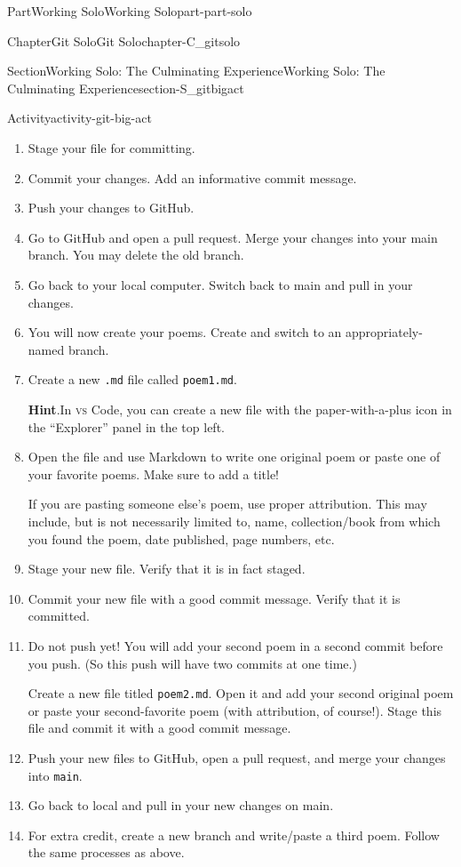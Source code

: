 \documentclass[twoside,10pt,]{book}
\newcommand{\blocktitlefont}{\relax}
\newcommand{\mono}[1]{\texttt{#1}}
\newcommand{\initialism}[1]{\textsc{\MakeLowercase{#1}}}
\begin{document}
\begin{partptx}{Part}{Working Solo}{}{Working Solo}{}{}{part-part-solo}
\begin{chapterptx}{Chapter}{Git Solo}{}{Git Solo}{}{}{chapter-C_gitsolo}
\begin{sectionptx}{Section}{Working Solo: The Culminating Experience}{}{Working Solo: The Culminating Experience}{}{}{section-S_gitbigact}
\begin{activity}{Activity}{}{activity-git-big-act}
\begin{enumerate}[font=\bfseries,label=(\alph*),ref=\alph*]
\item{}Stage your file for committing.%
\item{}Commit your changes. Add an informative commit message.%
\item{}Push your changes to GitHub.%
\item{}Go to GitHub and open a pull request. Merge your changes into your main branch. You may delete the old branch.%
\item{}Go back to your local computer. Switch back to main and pull in your changes.%
\item{}You will now create your poems. Create and switch to an appropriately-named branch.%
\item{}Create a new \mono{.md} file called \mono{poem1.md}.%
\par\smallskip%
\noindent\textbf{\blocktitlefont Hint}.\label{hint-git-big-act-m-b}{}\hypertarget{hint-git-big-act-m-b}{}\quad{}In \initialism{VS} Code, you can create a new file with the paper-with-a-plus icon in the ``Explorer'' panel in the top left.%
\item{}Open the file and use Markdown to write one original poem or paste one of your favorite poems. Make sure to add a title!%
\par
If you are pasting someone else's poem, use proper attribution. This may include, but is not necessarily limited to, name, collection\slash{}book from which you found the poem, date published, page numbers, etc.%
\item{}Stage your new file. Verify that it is in fact staged.%
\item{}Commit your new file with a good commit message. Verify that it is committed.%
\item{}Do not push yet! You will add your second poem in a second commit before you push. (So this push will have two commits at one time.)%
\par
Create a new file titled \mono{poem2.md}. Open it and add your second original poem or paste your second-favorite poem (with attribution, of course!). Stage this file and commit it with a good commit message.%
\item{}Push your new files to GitHub, open a pull request, and merge your changes into \mono{main}.%
\item{}Go back to local and pull in your new changes on main.%
\item{}For extra credit, create a new branch and write\slash{}paste a third poem. Follow the same processes as above.%
\end{enumerate}%

\end{activity}
\end{sectionptx}
\end{chapterptx}
\end{partptx}
\end{document}
